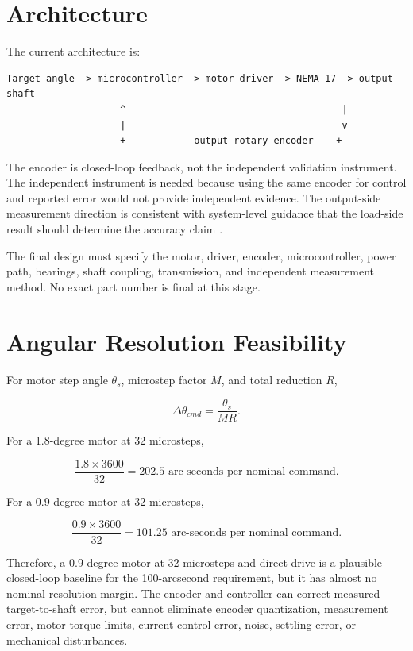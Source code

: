 \documentclass[11pt,a4paper]{article}
\begin{document}
\section{Architecture}

The current architecture is:

\begin{verbatim}
Target angle -> microcontroller -> motor driver -> NEMA 17 -> output shaft
                    ^                                      |
                    |                                      v
                    +----------- output rotary encoder ---+
\end{verbatim}

The encoder is closed-loop feedback, not the independent validation instrument. The independent instrument is needed because using the same encoder for control and reported error would not provide independent evidence. The output-side measurement direction is consistent with system-level guidance that the load-side result should determine the accuracy claim \cite{industrial}.

The final design must specify the motor, driver, encoder, microcontroller, power path, bearings, shaft coupling, transmission, and independent measurement method. No exact part number is final at this stage.

\section{Angular Resolution Feasibility}

For motor step angle $\theta_s$, microstep factor $M$, and total reduction $R$,

\begin{equation}
\Delta\theta_{cmd}=\frac{\theta_s}{M R}.
\end{equation}

For a 1.8-degree motor at 32 microsteps,

\begin{equation}
\frac{1.8\times3600}{32}=202.5\text{ arc-seconds per nominal command}.
\end{equation}

For a 0.9-degree motor at 32 microsteps,

\begin{equation}
\frac{0.9\times3600}{32}=101.25\text{ arc-seconds per nominal command}.
\end{equation}

Therefore, a 0.9-degree motor at 32 microsteps and direct drive is a plausible closed-loop baseline for the 100-arcsecond requirement, but it has almost no nominal resolution margin. The encoder and controller can correct measured target-to-shaft error, but cannot eliminate encoder quantization, measurement error, motor torque limits, current-control error, noise, settling error, or mechanical disturbances.
\end{document}
